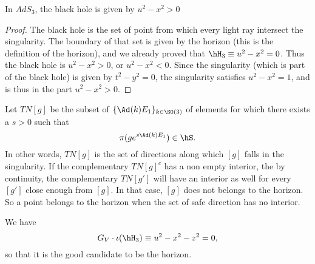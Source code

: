 \begin{lemma}		\label{LemTNTroisIneq}
In $AdS_3$, the black hole is given by $u^2-x^2>0$
\end{lemma}

\begin{proof}
The black hole is the set of point from which every light ray intersect the singularity. The boundary of that set is given by the horizon (this is the definition of the horizon), and we already proved that $\hH_3\equiv u^2-x^2=0$. Thus the black hole is $u^2-x^2>0$, or $u^2-x^2<0$. Since the singularity (which is part of the black hole) is given by $t^2-y^2=0$, the singularity satisfies $u^2-x^2=1$, and is thus in the part $u^2-x^2>0$.
\end{proof}


Let $TN[g]$ be the subset of $\{ \Ad(k)E_1 \}_{k\in \SO(3)}$ of elements for which there exists a $s>0$ such that
\begin{equation}
	\pi(g e^{s\Ad(k)E_1})\in\hS.
\end{equation}
In other words, $TN[g]$ is the set of directions along which $[g]$ falls in the singularity. If the complementary $TN[g]^c$ has a non empty interior, the by continuity, the complementary $TN[g']$ will have an interior as well for every $[g']$ close enough from $[g]$. In that case, $[g]$ does not belongs to the horizon. So a point belongs to the horizon when the set of safe direction has no interior.


\begin{lemma}
We have
\begin{equation}
	G_V\cdot\iota(\hH_3)\equiv u^2-x^2-z^2=0,
\end{equation}
so that it is the good candidate to be the horizon.
\end{lemma}


